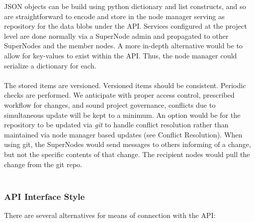 \documentclass[oneside,12pt]{memoir}
\begin{document}
    JSON objects can be build using python dictionary and list constructs, and so are straightforward to encode and store in the node manager serving as repository for the data blobs under the API.   Services configured at the project level are done normally via a SuperNode admin and propagated to other SuperNodes and the member nodes.  A more in-depth alternative would be to allow for key-values to exist within the API.  Thus, the node manager could serialize a dictionary for each.\\
\\
The stored items are versioned.  Versioned items should be consistent.  Periodic checks are performed.  We anticipate with proper access control, prescribed workflow for changes, and sound project governance, conflicts due to simultaneous update will be kept to a minimum.  An option would be for the repository to be updated via \emph{git} to handle conflict resolution rather than maintained via node manager based updates (see Conflict Resolution).
When using git, the SuperNodes would send messages to others informing of a change, but not the specific contents of that change.  The recipient nodes would pull the change from the git repo.  
\\
\\

\subsubsection{API Interface Style}

There are several alternatives for means of connection with the API:
\end{document}
